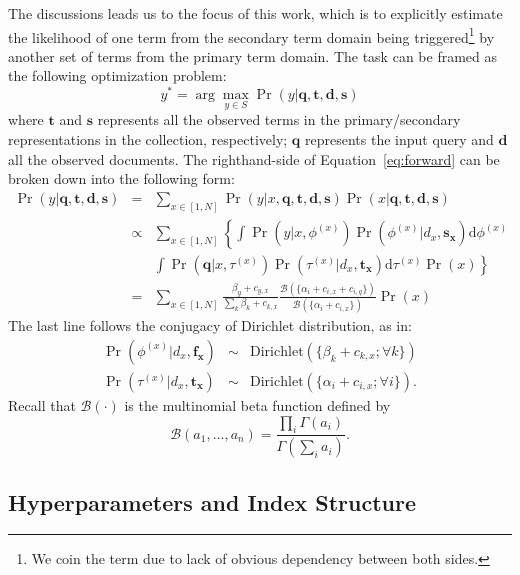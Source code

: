 The discussions leads us to the focus of this work, which is to explicitly
estimate the likelihood of one term from the secondary term domain being
triggered\footnote{We coin the term due to lack of obvious dependency
between both sides.} by another set of terms from the primary term
domain.  The task can be framed as the following optimization problem:
\begin{equation} y^* = \arg\max_{y \in S} \Pr(y|\mathbf{q}, \mathbf{t},
\mathbf{d}, \mathbf{s}) \label{eq:forward} \end{equation} where $\mathbf{t}$
and $\mathbf{s}$ represents all the observed terms in the primary/secondary
representations in the collection, respectively; $\mathbf{q}$ represents
the input query and $\mathbf{d}$ all the observed documents.  The 
righthand-side of Equation~\eqref{eq:forward} can be broken down into the following form:
\begin{eqnarray}
  \Pr(y|\mathbf{q}, \mathbf{t}, \mathbf{d}, \mathbf{s}) 
  &=& \sum_{x \in [1, N]} \Pr(y|x, \mathbf{q}, \mathbf{t}, \mathbf{d}, \mathbf{s}) \Pr(x|\mathbf{q}, \mathbf{t}, \mathbf{d}, \mathbf{s}) \nonumber\\
  &\propto& \sum_{x \in [1, N]} \left\{ \int \Pr(y|x, \phi^{(x)}) \Pr(\phi^{(x)}|d_x, \mathbf{s_x}) \mathrm{d}\phi^{(x)} \right. \nonumber\\
  && \left. \int \Pr(\mathbf{q}| x, \tau^{(x)}) \Pr(\tau^{(x)}|d_x, \mathbf{t_x})\mathrm{d}\tau^{(x)} \Pr(x) \right\} \nonumber\\
  &=& \sum_{x \in [1, N]} \frac{\beta_y + c_{y,x}}{\sum_k \beta_k + c_{k,x}} \frac{\mathcal{B}(\{\alpha_i + c_{i,x} + c_{i,q} \})}{\mathcal{B}(\{\alpha_i + c_{i,x} \})} \Pr(x) \label{eq:forward-solution}
\end{eqnarray}
The last line follows the conjugacy of Dirichlet distribution, as in:
\begin{eqnarray*}
\Pr(\phi^{(x)}|d_x,\mathbf{f_x}) &\sim& \mathrm{Dirichlet}(\{\beta_k + c_{k,x}; \forall k \}) \\
\Pr(\tau^{(x)}|d_x, \mathbf{t_x}) &\sim& \mathrm{Dirichlet}(\{\alpha_i + c_{i,x}; \forall i \}).
\end{eqnarray*}
Recall that $\mathcal{B}(\cdot)$ is the multinomial beta
function defined by \[\mathcal{B}(a_1, \ldots, a_n) = \frac{\prod_i
\Gamma(a_i)}{\Gamma(\sum_i a_i)}. \]

\subsection{Hyperparameters and Index Structure}

